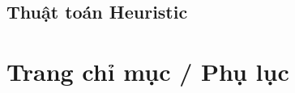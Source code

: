\documentclass[12pt,a4paper]{report}
\begin{document}
\subsection*{Thuật toán Heuristic}






\section*{Trang chỉ mục / Phụ lục}

\nocite{*}


\end{document}

